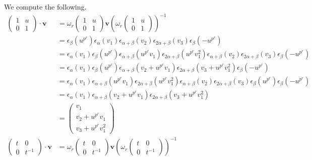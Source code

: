 We compute the following.
\begin{align*}
\left(\begin{matrix} 1 & u \\ 0 & 1\end{matrix}\right) \cdot \mathbf{v} &= \omega_r\left(\begin{matrix} 1 & u \\ 0 & 1\end{matrix}\right) \mathbf{v}\left( \omega_r\left(\begin{matrix} 1 & u \\ 0 & 1\end{matrix}\right)\right)^{-1} \\
&=\epsilon_\beta (u^{p^r}) \epsilon_\alpha (v_1)\epsilon_{\alpha+\beta}(v_2) \epsilon_{2\alpha+\beta}(v_3) \epsilon_\beta (-u^{p^r}) \\
&=\epsilon_\alpha (v_1) \epsilon_\beta (u^{p^r}) \epsilon_{\alpha+\beta}(u^{p^r}v_1) \epsilon_{2\alpha+\beta}(u^{p^r}v_1^2) \epsilon_{\alpha+\beta}(v_2) \epsilon_{2\alpha+\beta}(v_3) \epsilon_\beta (-u^{p^r})  \\
&=\epsilon_\alpha (v_1) \epsilon_\beta (u^{p^r}) \epsilon_{\alpha+\beta}(v_2 + u^{p^r}v_1) \epsilon_{2\alpha+\beta}(v_3 + u^{p^r}v_1^2)  \epsilon_\beta (-u^{p^r})  \\
&=\epsilon_\alpha (v_1) \epsilon_{\alpha+\beta}(u^{p^r}v_1) \epsilon_{2\alpha+\beta}(u^{p^r}v_1^2) \epsilon_{\alpha+\beta}(v_2) \epsilon_{2\alpha+\beta}(v_3)\epsilon_\beta (u^{p^r})  \epsilon_\beta (-u^{p^r})  \\
&=\epsilon_\alpha (v_1)  \epsilon_{\alpha+\beta}(v_2 + u^{p^r}v_1) \epsilon_{2\alpha+\beta}(v_3 + u^{p^r}v_1^2) \\
&= \left(\begin{matrix} v_1 \\ v_2 + u^{p^r}v_1\\ v_3 + u^{p^r}v_1^2 \end{matrix}\right)\\
\left(\begin{matrix} t & 0 \\ 0 & t^{-1}\end{matrix}\right) \cdot \mathbf{v} &=
\omega_r\left(\begin{matrix} t & 0 \\ 0 & t^{-1}\end{matrix}\right) \mathbf{v}\left( \omega_r\left(\begin{matrix} t & 0 \\ 0 & t^{-1}\end{matrix}\right)\right)^{-1} \\

\end{align*}
